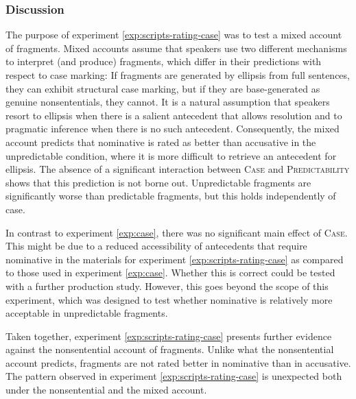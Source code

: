 \subsubsection{Discussion}
The purpose of experiment \ref{exp:scripts-rating-case} was to test a mixed account of fragments. Mixed accounts assume that speakers use two different mechanisms to interpret (and produce) fragments, which differ in their predictions with respect to case marking: If fragments are generated by ellipsis from full sentences, they can exhibit structural case marking, but if they are base-generated as genuine nonsententials, they cannot. It is a natural assumption that speakers resort to ellipsis when there is a salient antecedent that allows resolution and to pragmatic inference when there is no such antecedent. Consequently, the mixed account predicts that nominative is rated as better than accusative in the unpredictable condition, where it is more difficult to retrieve an antecedent for ellipsis. The absence of a significant interaction between \textsc{Case} and \textsc{Predictability} shows that this prediction is not borne out. Unpredictable fragments are significantly worse than predictable fragments, but this holds independently of case.

In contrast to experiment \ref{exp:case}, there was no significant main effect of \textsc{Case}. This might be due to a reduced accessibility of antecedents that require nominative in the materials for experiment \ref{exp:scripts-rating-case} as compared to those used in experiment \ref{exp:case}. Whether this is correct could be tested with a further production study. However, this goes beyond the scope of this experiment, which was designed to test whether nominative is relatively more acceptable in unpredictable fragments.

Taken together, experiment \ref{exp:scripts-rating-case} presents further evidence against the nonsentential account of fragments. Unlike what the nonsentential account predicts, fragments are not rated better in nominative than in accusative. The pattern observed in experiment \ref{exp:scripts-rating-case} is unexpected both under the nonsentential and the mixed account.

